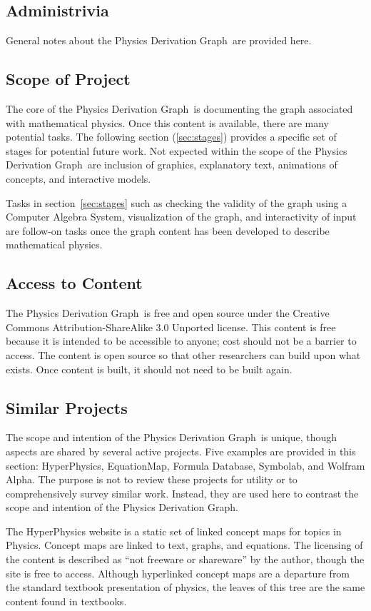 \documentclass{article}
\newcommand{\pdg}{Physics Derivation Graph}
\begin{document}
\begin{multicols}{2}
\section{Administrivia}
General notes about the \pdg\ are provided here. 
\subsection{Scope of Project\label{sec:scope}}

The core of the \pdg\ is documenting the graph associated with mathematical physics. Once this content is available, there are many potential tasks. The following section (\ref{sec:stages}) provides a specific set of stages for potential future work. Not expected within the scope of the \pdg\ are inclusion of graphics, explanatory text, animations of concepts, and interactive models. 

Tasks in section~\ref{sec:stages} such as checking the validity of the graph using a Computer Algebra System, visualization of the graph, and interactivity of input are follow-on tasks once the graph content has been developed to describe mathematical physics.

\subsection{Access to Content\label{sec:access}}

The \pdg\ is free and open source under the Creative Commons Attribution-ShareAlike 3.0 Unported license. This content is free because it is intended to be accessible to anyone; cost should not be a barrier to access. The content is open source so that other researchers can build upon what exists. Once content is built, it should not need to be built again. 

\subsection{Similar Projects\label{sec:similar_projects}}

The scope and intention of the \pdg\ is unique, though aspects are shared by several active projects. Five examples are provided in this section: HyperPhysics, EquationMap, Formula Database, Symbolab, and Wolfram Alpha. The purpose is not to review these projects for utility or to comprehensively survey similar work. Instead, they are used here to contrast the scope and intention of the \pdg. 

The HyperPhysics website\cite{2015_Hyperphysics} is a static set of linked concept maps for topics in Physics. Concept maps are linked to text, graphs, and equations. The licensing of the content is described as ``not freeware or shareware'' by the author, though the site is free to access. Although hyperlinked concept maps are a departure from the standard textbook presentation of physics, the leaves of this tree are the same content found in textbooks. 


\end{multicols}
\end{document}
